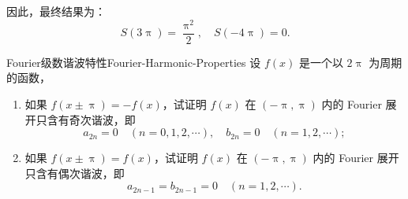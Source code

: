 \begin{solution}
    因此，最终结果为：
    \begin{equation}
        \boxed{S(3\uppi) = \frac{\uppi^2}{2}, \quad S(-4\uppi) = 0}.
    \end{equation}
\end{solution}

\begin{problem}{Fourier级数谐波特性}{Fourier-Harmonic-Properties}
    设 $f(x)$ 是一个以 $2\uppi$ 为周期的函数，
    \begin{enumerate}
        \item 如果 $f(x \pm \uppi) = -f(x)$，试证明 $f(x)$ 在 $(-\uppi, \uppi)$ 内的 Fourier 展开只含有奇次谐波，即
              \begin{equation*}
                  a_{2n} = 0 \quad (n = 0, 1, 2, \cdots), \quad b_{2n} = 0 \quad (n = 1, 2, \cdots);
              \end{equation*}
        \item 如果 $f(x \pm \uppi) = f(x)$，试证明 $f(x)$ 在 $(-\uppi, \uppi)$ 内的 Fourier 展开只含有偶次谐波，即
              \begin{equation*}
                  a_{2n-1} = b_{2n-1} = 0 \quad (n = 1, 2, \cdots).
              \end{equation*}
    \end{enumerate}
\end{problem}

